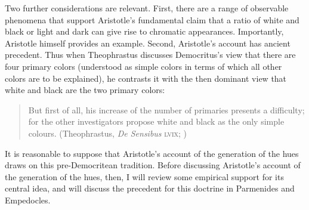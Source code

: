 Two further considerations are relevant. First, there are a range of observable phenomena that support Aristotle's fundamental claim that a ratio of white and black or light and dark can give rise to chromatic appearances. Importantly, Aristotle himself provides an example. Second, Aristotle's account has ancient precedent. Thus when Theophrastus discusses Democritus's view that there are four primary colors (understood as simple colors in terms of which all other colors are to be explained), he contrasts it with the then dominant view that white and black are the two primary colors:
\begin{quote}
    But first of all, his increase of the number of primaries presents a difficulty; for the other investigators propose white and black as the only simple colours. (Theophrastus, \emph{De Sensibus} \textsc{lvix}; \citealt[137]{Stratton:1917vn})
\end{quote}
It is reasonable to suppose that Aristotle's account of the generation of the hues draws on this pre-Democritean tradition. Before discussing Aristotle's account of the generation of the hues, then, I will review some empirical support for its central idea, and will discuss the precedent for this doctrine in Parmenides and Empedocles.


